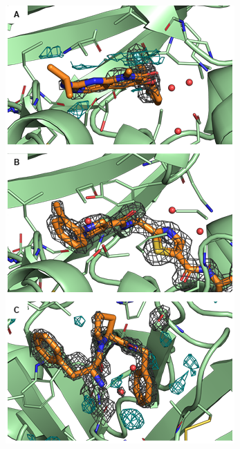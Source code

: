 \documentclass[9pt,bestpractices]{livecoms}
\begin{document}
\begin{figure}
    \centering
    \includegraphics[width=.47\textwidth]{figures/crystal/crystal2.png}
    {
        \label{fig:3fly}
        \label{fig:6sfi}
        \label{fig:2zff}
    }
    

\end{figure}
\end{document}
